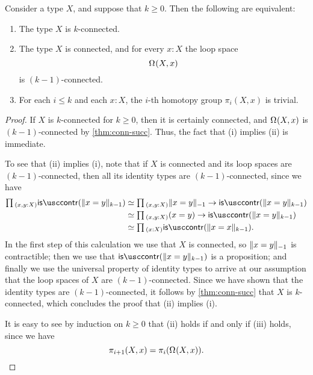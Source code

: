 \begin{thm}\label{thm:conn-htpy-groups}
  Consider a type $X$, and suppose that $k\geq 0$. Then the following are equivalent:
  \begin{enumerate}
  \item The type $X$ is $k$-connected.
  \item The type $X$ is connected, and for every $x:X$ the loop space
    \begin{equation*}
      \loopspace{X,x}
    \end{equation*}
    is $(k-1)$-connected.
  \item For each $i\leq k$ and each $x:X$, the $i$-th homotopy group $\pi_i(X,x)$ is trivial.
  \end{enumerate}
\end{thm}

\begin{proof}
  If $X$ is $k$-connected for $k\geq 0$, then it is certainly connected, and $\loopspace{X,x}$ is $(k-1)$-connected by \cref{thm:conn-succ}. Thus, the fact that (i) implies (ii) is immediate.

  To see that (ii) implies (i), note that if $X$ is connected and its loop spaces are $(k-1)$-connected, then all its identity types are $(k-1)$-connected, since we have
  \begin{align*}
    \prd{x,y:X}\iscontr(\trunc{k-1}{x=y}) & \simeq \prd{x,y:X}\trunc{-1}{x=y}\to\iscontr(\trunc{k-1}{x=y}) \\
    & \simeq \prd{x,y:X}(x=y)\to\iscontr(\trunc{k-1}{x=y}) \\
    & \simeq \prd{x:X}\iscontr(\trunc{k-1}{x=x}).
  \end{align*}
  In the first step of this calculation we use that $X$ is connected, so $\trunc{-1}{x=y}$ is contractible; then we use that $\iscontr(\trunc{k-1}{x=y})$ is a proposition; and finally we use the universal property of identity types to arrive at our assumption that the loop spaces of $X$ are $(k-1)$-connected. Since we have shown that the identity types are $(k-1)$-connected, it follows by \cref{thm:conn-succ} that $X$ is $k$-connected, which concludes the proof that (ii) implies (i).

  It is easy to see by induction on $k\geq 0$ that (ii) holds if and only if (iii) holds, since we have
  \begin{equation*}
    \pi_{i+1}(X,x)=\pi_i(\loopspace{X,x}).\qedhere
  \end{equation*}
\end{proof}

